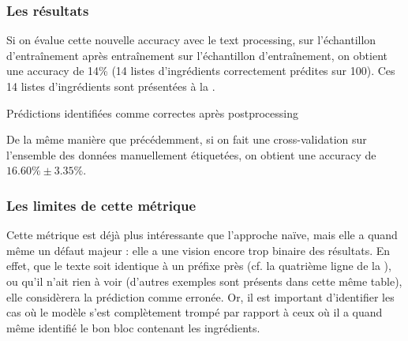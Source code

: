                 \subsubsection{Les résultats}

                Si on évalue cette nouvelle accuracy avec le text processing, sur l'échantillon d'entraînement après entraînement sur l'échantillon d'entraînement, on obtient une accuracy de 14\% (14 listes d'ingrédients correctement prédites sur 100).
                Ces 14 listes d'ingrédients sont présentées à la .

               {\renewcommand{\arraystretch}{1.5}%
                \begin{table}
                    \begin{spacing}{1.0}
                    \begin{center}
                    {\scriptsize
                    
                    }
                    \caption{Prédictions identifiées comme correctes après postprocessing}
                    \label{tbl:GT_postprocessed_corrects}
                    \end{center}
                    \end{spacing}
                \end{table}
                }

                De la même manière que précédemment, si on fait une cross-validation sur l'ensemble des données manuellement étiquetées, on obtient une accuracy de $16.60\% \pm 3.35\%$.

                \subsubsection{Les limites de cette métrique}

                Cette métrique est déjà plus intéressante que l'approche naïve, mais elle a quand même un défaut majeur : elle a une vision encore trop binaire des résultats.
                En effet, que le texte soit identique à un préfixe près (cf. la quatrième ligne de la ), ou qu'il n'ait rien à voir (d'autres exemples sont présents dans cette même table), elle considèrera la prédiction comme erronée.
                Or, il est important d'identifier les cas où le modèle s'est complètement trompé par rapport à ceux où il a quand même identifié le bon bloc contenant les ingrédients.

